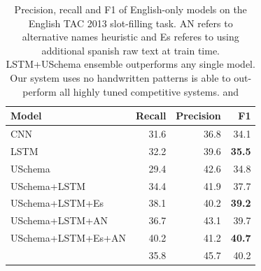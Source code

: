 \begin{table}[tb]
\begin{center}
\begin{tabular}{|lrrr|}
\hline
\bf Model & \bf Recall & \bf Precision & \bf F1 \\
\hline\hline
CNN                 & 31.6 & 36.8 & 34.1 \\
LSTM                & 32.2 & 39.6 & \bf 35.5  \\
USchema             & 29.4 & 42.6 & 34.8 \\
\hline\hline
USchema+LSTM        & 34.4 & 41.9 & 37.7 \\
USchema+LSTM+Es        & 38.1 & 40.2 & \bf 39.2 \\
\hline\hline
USchema+LSTM+AN	& 36.7 & 43.1 & 39.7 \\
USchema+LSTM+Es+AN & 40.2 & 41.2 & \bf 40.7 \\
\citet{roth2014relationfactory} & 35.8 & 45.7 & 40.2 \\

\hline
\end{tabular}
\caption{Precision, recall and F1 of English-only models on the English TAC 2013 slot-filling task. AN refers to alternative names heuristic and Es referes to using additional spanish raw text at train time. LSTM+USchema ensemble outperforms any single model. Our system uses no handwritten patterns is able to out-perform all highly tuned competitive systems. \protect\citet{roth2014relationfactory} and \protect\citet{angeli2014stanford} %
\label{en-tac-table}}
\end{center}
\end{table}

